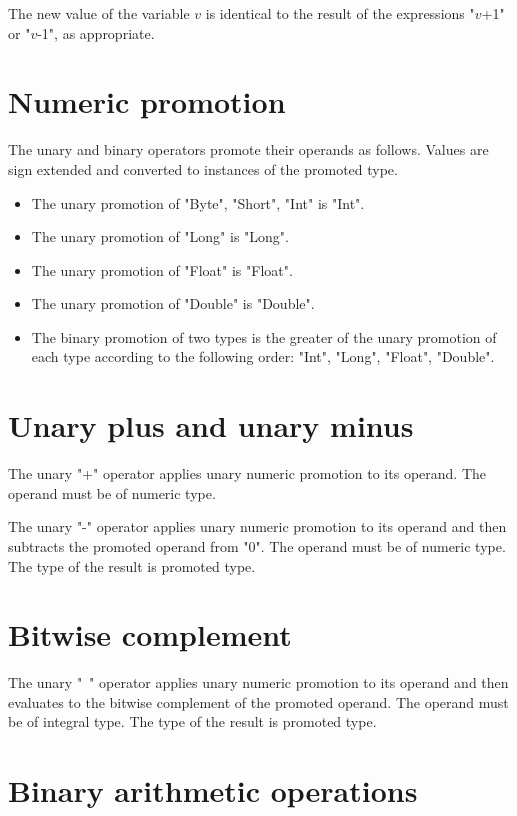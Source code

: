 The new value of the variable $v$ is identical to the result of
the expressions
\xcdmath"$v$+1" or \xcdmath"$v$-1", as appropriate.

\section{Numeric promotion}
\label{XtenPromotions}

The unary and binary operators promote their operands as
follows.
Values are sign extended and converted to instances of the
promoted type.

\begin{itemize}
\item  The unary promotion of \xcd"Byte", \xcd"Short",
\xcd"Int" is \xcd"Int".
\item  The unary promotion of \xcd"Long" is \xcd"Long".
\item  The unary promotion of \xcd"Float" is \xcd"Float".
\item  The unary promotion of \xcd"Double" is \xcd"Double".
\item The binary promotion of two types is the  
greater of the unary promotion of each type
according to the following order:
\xcd"Int", \xcd"Long", \xcd"Float", \xcd"Double".
\end{itemize}

\section{Unary plus and unary minus}

The unary \xcd"+" operator applies unary numeric promotion to
its operand.   The operand must be of numeric type.

The unary \xcd"-" operator
applies unary numeric promotion to its operand
and then
subtracts the promoted operand from \xcd"0".
The operand must be of numeric type.
The type of the result is promoted type.

\section{Bitwise complement}

 The unary \xcd"~" operator
applies unary numeric promotion to its operand
and then
 evaluates to the bitwise complement of
 the promoted operand.
  The operand must be of integral type.
The type of the result is promoted type.

\section{Binary arithmetic operations} 

